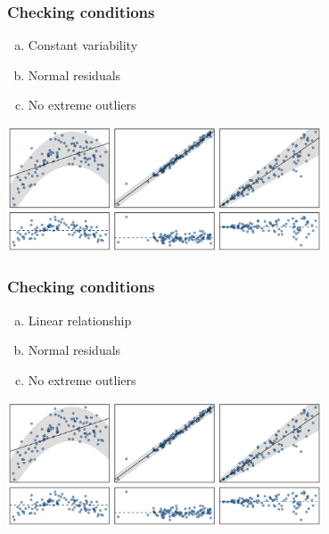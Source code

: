 \documentclass[notes,11pt, aspectratio=169]{beamer}
\begin{document}

\begin{frame}
\frametitle{Checking conditions}

{
\begin{enumerate}[(a)]
\item Constant variability
\item Normal residuals
\item No extreme outliers
\end{enumerate}
}
{
\begin{center}
\includegraphics[width=0.7\textwidth]{graphs/nonlinear}
\end{center}
}

\end{frame}


\begin{frame}
\frametitle{Checking conditions}

{
\begin{enumerate}[(a)]
\item Linear relationship
\item Normal residuals
\item No extreme outliers
\end{enumerate}
}
{
\begin{center}
\includegraphics[width=0.7\textwidth]{graphs/heteroscedastic}
\end{center}
}

\end{frame}
\end{document}
